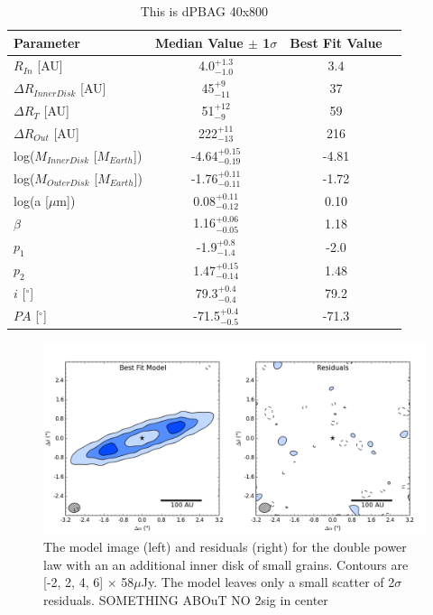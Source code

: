{{\begin{table}
\begin{center}
    \def\arraystretch{1.37}%
    \begin{tabular}{l*{2}{c}r}
    \hline
    Parameter & Median Value $\pm$ 1$\sigma$ & Best Fit Value \\ \hline
     $R_{In}$  [AU] & 4.0$^{+1.3}_{-1.0}$ & 3.4\\  
     $\Delta R_{Inner Disk}$ [AU] & 45$^{+9}_{-11}$ & 37\\ 
     $\Delta R_{T}$ [AU] & 51$^{+12}_{-9}$ & 59\\ 
     $\Delta R_{Out}$  [AU] & 222$^{+11}_{-13}$ & 216\\ 
     log($M_{Inner Disk}$ [$M_{Earth}$]) & -4.64$^{+0.15}_{-0.19}$ & -4.81 \\
     log($M_{Outer Disk}$ [$M_{Earth}$]) & -1.76$^{+0.11}_{-0.11}$ &-1.72 \\
     log(a [$\mu$m]) & 0.08$^{+0.11}_{-0.12}$ & 0.10\\ 
     $\beta$ & 1.16$^{+0.06}_{-0.05}$ & 1.18\\ 
     $p_{1}$ & -1.9$^{+0.8}_{-1.4}$ & -2.0\\ 
     $p_{2}$ & 1.47$^{+0.15}_{-0.14}$ & 1.48\\ 
     $i$ [$^\circ$] & 79.3$^{+0.4}_{-0.4}$ & 79.2 \\ 
     $PA$ [$^\circ$] & -71.5$^{+0.4}_{-0.5}$ & -71.3\\
    \hline
    \end{tabular}
\end{center}
\caption{This is dPBAG 40x800}
\end{table}


\begin{figure}
\centering
\includegraphics[width = 1\textwidth]{49CET_dPBAG_ModelResidual.png}
\caption{The model image (left) and residuals (right) for the double power law with an an additional inner disk of small grains. Contours are [-2, 2, 4, 6] $\times$ 58$\mu$Jy. The model leaves only a small scatter of 2$\sigma$ residuals. SOMETHING ABOuT NO 2sig in center}
\label{fig:49CET_dPBAG_ModelResidual}
\end{figure}

}}
